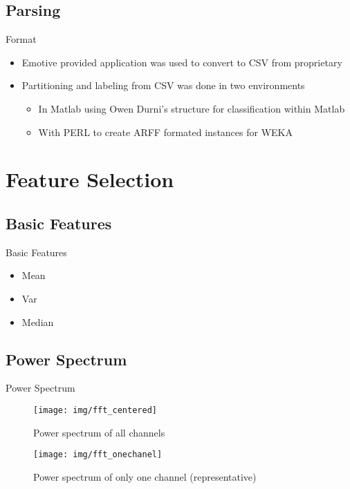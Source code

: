 \subsection{Parsing}
\begin{frame}{ }
    \begin{block}{Format} \begin{itemize}
	\item  Emotive provided application was used to convert to CSV from proprietary
	\item  Partitioning and labeling from CSV was done in two environments
	\begin{itemize}
		\item In Matlab using Owen Durni's structure for classification within Matlab
		\item With PERL to create ARFF formated instances for WEKA
	\end{itemize}
    \end{itemize} \end{block}
\end{frame}

\section{Feature Selection}
\subsection{Basic Features}
\begin{frame}{ }
    \begin{block}{Basic Features} \begin{itemize}
    	\item Mean
    	\item Var
    	\item Median
    \end{itemize} \end{block}
\end{frame}

\subsection{Power Spectrum}
\begin{frame}{ Power Spectrum}
    \begin{multicols}{2}
    \begin{figure}
    \texttt{[image: img/fft\_centered]}
    \caption{Power spectrum of all channels}
    \end{figure}
    \begin{figure}
    \texttt{[image: img/fft\_onechanel]}
    \caption{Power spectrum of only one channel (representative)}
    \end{figure}
    \end{multicols}
\end{frame}

